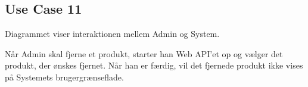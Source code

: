 \subsection{Use Case 11}
Diagrammet viser interaktionen mellem Admin og System.


Når Admin skal fjerne et produkt, starter han Web API'et op og vælger det produkt, der ønskes fjernet. Når han er færdig, vil det fjernede produkt ikke vises på Systemets brugergrænseflade.